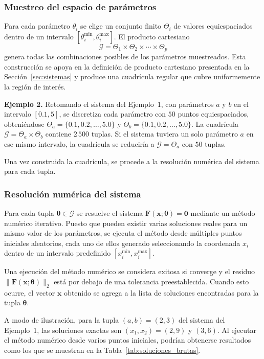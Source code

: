 \documentclass{article} \usepackage[utf8]{inputenc} \usepackage[spanish]{babel} \spanishdecimal{.} \usepackage{amsmath, amssymb, amsthm} \usepackage{bm} \usepackage{float} \usepackage{longtable} \usepackage[hidelinks]{hyperref}
\newcommand{\xvec}{\mathbf{x}} \newcommand{\thetavec}{\boldsymbol{\theta}} \newcommand{\Fvec}{\mathbf{F}} \newcommand{\R}{\mathbb{R}} \newcommand{\norm}[1]{\left\lVert#1\right\rVert} \newcommand{\loss}{\mathcal{L}} \newcommand{\dataset}{\mathcal{D}} \newcommand{\jac}{\mathbf{J}}
\begin{document}
\subsubsection{Muestreo del espacio de parámetros}

Para cada parámetro \(\theta_i\) se elige un conjunto finito
\(\Theta_i\) de valores equiespaciados dentro de un intervalo
\([\theta_i^{\min}, \theta_i^{\max}]\). El producto cartesiano
\[
\mathcal{G} = \Theta_1 \times \Theta_2 \times \cdots \times \Theta_p
\]
genera todas las combinaciones posibles de los parámetros muestreados.
Esta construcción se apoya en la definición de producto cartesiano
presentada en la Sección~\ref{sec:sistemas} y produce una cuadrícula
regular que cubre uniformemente la región de interés.

\noindent\textbf{Ejemplo 2.} Retomando el sistema del Ejemplo~1, con
parámetros \(a\) y \(b\) en el intervalo \([0.1, 5]\), se discretiza
cada parámetro con \(50\) puntos equiespaciados, obteniéndose
\(\Theta_a = \{0.1, 0.2, \dots, 5.0\}\) y
\(\Theta_b = \{0.1, 0.2, \dots, 5.0\}\). La cuadrícula
\(\mathcal{G} = \Theta_a \times \Theta_b\) contiene \(2\,500\) tuplas.
Si el sistema tuviera un solo parámetro \(a\) en ese mismo intervalo,
la cuadrícula se reduciría a \(\mathcal{G} = \Theta_a\) con \(50\)
tuplas.

Una vez construida la cuadrícula, se procede a la resolución numérica
del sistema para cada tupla.

\subsubsection{Resolución numérica del sistema}

Para cada tupla \(\thetavec \in \mathcal{G}\) se resuelve el sistema
\(\Fvec(\xvec; \thetavec) = \mathbf{0}\) mediante un método numérico
iterativo. Puesto que pueden existir varias soluciones reales para un
mismo valor de los parámetros, se ejecuta el método desde múltiples
puntos iniciales aleatorios, cada uno de ellos generado seleccionando
la coordenada \(x_i\) dentro de un intervalo predefinido
\([x_i^{\min}, x_i^{\max}]\).

Una ejecución del método numérico se considera exitosa si converge y
el residuo \(\|\Fvec(\xvec; \thetavec)\|_2\) está por debajo de una
tolerancia preestablecida. Cuando esto ocurre, el vector \(\xvec\)
obtenido se agrega a la lista de soluciones encontradas para la tupla
\(\thetavec\).

A modo de ilustración, para la tupla \((a,b) = (2,3)\) del sistema del
Ejemplo~1, las soluciones exactas son \((x_1,x_2) = (2,9)\) y
\((3,6)\). Al ejecutar el método numérico desde varios puntos
iniciales, podrían obtenerse resultados como los que se muestran en la
Tabla~\ref{tab:soluciones_brutas}.
\end{document}
